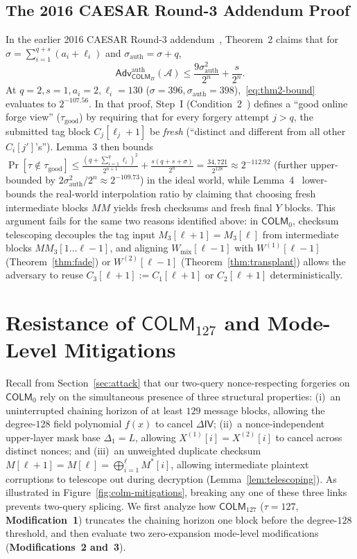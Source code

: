\documentclass[11pt,a4paper]{article}
\theoremstyle{definition}
\theoremstyle{remark}
\newcommand{\COLM}{\mathsf{COLM}}
\newcommand{\COLMzero}{\mathsf{COLM}_0}
\newcommand{\COLMott}{\mathsf{COLM}_{127}}
\newcommand{\IV}{\mathsf{IV}}
\newcommand{\Adv}{\mathsf{Adv}}
\begin{document}
\subsection{The 2016 CAESAR Round-3 Addendum Proof}
In the earlier 2016 CAESAR Round-3 addendum~\cite[Section~2, p.~3]{COLMadd}, Theorem~2 claims that for $\sigma = \sum_{i=1}^{q+s} (a_i + \ell_i)$ and $\sigma_{\mathrm{auth}} = \sigma + q$,
\begin{equation}
\label{eq:thm2-bound}
\Adv^{\mathrm{auth}}_{\COLM_\Pi}(\mathcal{A}) \le \frac{9\sigma_{\mathrm{auth}}^2}{2^n} + \frac{s}{2^n}.
\end{equation}
At $q = 2, s = 1, a_i = 2, \ell_i = 130$ ($\sigma = 396, \sigma_{\mathrm{auth}} = 398$),~\eqref{eq:thm2-bound} evaluates to $2^{-107.56}$. In that proof, Step~I (Condition~2~\cite[p.~3]{COLMadd}) defines a ``good online forge view'' ($\tau_{\mathrm{good}}$) by requiring that for every forgery attempt $j > q$, the submitted tag block $C_j[\ell_j + 1]$ be \emph{fresh} (``distinct and different from all other $C_i[j']$'s''). Lemma~3 then bounds $\Pr[\tau \notin \tau_{\mathrm{good}}] \le \frac{(q + \sum_{i=1}^q \ell_i)^2}{2^{n+1}} + \frac{s(q + s + \sigma)}{2^n} = \frac{34{,}721}{2^{128}} \approx 2^{-112.92}$ (further upper-bounded by $2\sigma_{\mathrm{auth}}^2 / 2^n \approx 2^{-109.73}$) in the ideal world, while Lemma~4~\cite[pp.~3--4]{COLMadd} lower-bounds the real-world interpolation ratio by claiming that choosing fresh intermediate blocks $MM$ yields fresh checksums and fresh final $Y$ blocks. This argument fails for the same two reasons identified above: in $\COLMzero$, checksum telescoping decouples the tag input $M_3[\ell+1] = M_3[\ell]$ from intermediate blocks $MM_3[1 \dots \ell-1]$, and aligning $W_{\mathrm{mix}}[\ell-1]$ with $W^{(1)}[\ell-1]$ (Theorem~\ref{thm:fade}) or $W^{(2)}[\ell-1]$ (Theorem~\ref{thm:transplant}) allows the adversary to reuse $C_3[\ell+1] := C_1[\ell+1]$ or $C_2[\ell+1]$ deterministically.

\section{Resistance of \texorpdfstring{$\COLMott$}{COLM\_127} and Mode-Level Mitigations}
\label{sec:repair}

Recall from Section~\ref{sec:attack} that our two-query nonce-respecting forgeries on $\COLMzero$ rely on the simultaneous presence of three structural properties:
(i)~an uninterrupted chaining horizon of at least $129$ message blocks, allowing the degree-$128$ field polynomial $f(x)$ to cancel $\Delta\IV$;
(ii)~a nonce-independent upper-layer mask base $\Delta_1 = L$, allowing $X^{(1)}[i] = X^{(2)}[i]$ to cancel across distinct nonces; and
(iii)~an unweighted duplicate checksum $M[\ell+1] = M[\ell] = \bigoplus_{i=1}^\ell M^*[i]$, allowing intermediate plaintext corruptions to telescope out during decryption (Lemma~\ref{lem:telescoping}).
As illustrated in Figure~\ref{fig:colm-mitigations}, breaking any one of these three links prevents two-query splicing. We first analyze how $\COLMott$ ($\tau = 127$, \textbf{Modification~1}) truncates the chaining horizon one block before the degree-$128$ threshold, and then evaluate two zero-expansion mode-level modifications (\textbf{Modifications~2 and~3}).
\end{document}
